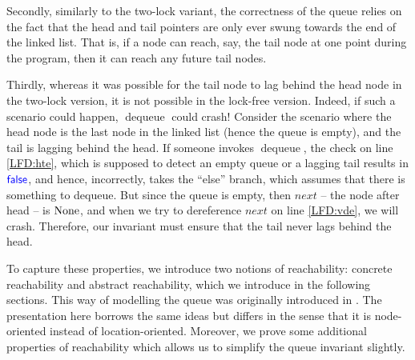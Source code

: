 \documentclass[a4paper, 10pt]{report}
\theoremstyle{definition}
\newcommand{\dequeue}{\operatorname{dequeue}}
\begin{document}
Secondly, similarly to the two-lock variant, the correctness of the queue relies on the fact that the head and tail pointers are only ever swung towards the end of the linked list. That is, if a node can reach, say, the tail node at one point during the program, then it can reach any future tail nodes.

Thirdly, whereas it was possible for the tail node to lag behind the head node in the two-lock version, it is not possible in the lock-free version. Indeed, if such a scenario could happen, $\dequeue$ could crash! Consider the scenario where the head node is the last node in the linked list (hence the queue is empty), and the tail is lagging behind the head. If someone invokes $\dequeue$, the check on line \ref{LFD:hte}, which is supposed to detect an empty queue or a lagging tail results in $\textsf{\color{blue} false}$, and hence, incorrectly, takes the ``else'' branch, which assumes that there is something to dequeue. But since the queue is empty, then $next$ -- the node after head -- is $\operatorname{None}$, and when we try to dereference $next$ on line \ref{LFD:vde}, we will crash. Therefore, our invariant must ensure that the tail never lags behind the head.

To capture these properties, we introduce two notions of reachability: concrete reachability and abstract reachability, which we introduce in the following sections. This way of modelling the queue was originally introduced in \citet{DBLP:conf/cpp/VindumB21}. The presentation here borrows the same ideas but differs in the sense that it is node-oriented instead of location-oriented. Moreover, we prove some additional properties of reachability which allows us to simplify the queue invariant slightly.
\end{document}
